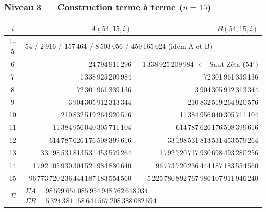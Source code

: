 \documentclass[11pt,a4paper]{article}
\begin{document}
\subsubsection{Niveau 3 --- Construction terme à terme (\texorpdfstring{$n = 15$}{n = 15})}
\begin{center}\small
\begin{tabular}{@{}c r r@{}}
\toprule
\rowcolor{spectralgris}
$i$ & $A(54,15,i)$ & $B(54,15,i)$ \\
\midrule
1--5 & \multicolumn{2}{l}{54 / 2\,916 / 157\,464 / 8\,503\,056 / 459\,165\,024 \quad (idem A et B)} \\
6 & 24\,794\,911\,296 & 1\,338\,925\,209\,984 \quad $\leftarrow$ Saut Zêta ($54^{7}$) \\
7 & 1\,338\,925\,209\,984 & 72\,301\,961\,339\,136 \\
8 & 72\,301\,961\,339\,136 & 3\,904\,305\,912\,313\,344 \\
9 & 3\,904\,305\,912\,313\,344 & 210\,832\,519\,264\,920\,576 \\
10 & 210\,832\,519\,264\,920\,576 & 11\,384\,956\,040\,305\,711\,104 \\
11 & 11\,384\,956\,040\,305\,711\,104 & 614\,787\,626\,176\,508\,399\,616 \\
12 & 614\,787\,626\,176\,508\,399\,616 & 33\,198\,531\,813\,531\,453\,579\,264 \\
13 & 33\,198\,531\,813\,531\,453\,579\,264 & 1\,792\,720\,717\,930\,698\,493\,280\,256 \\
14 & 1\,792\,105\,930\,304\,521\,984\,880\,640 & 96\,773\,720\,236\,444\,187\,183\,554\,560 \\
15 & 96\,773\,720\,236\,444\,187\,183\,554\,560 & 5\,225\,780\,892\,767\,986\,107\,911\,946\,240 \\
\midrule
$\Sigma$ & \multicolumn{2}{l}{$\Sigma A = 98\,599\,651\,085\,954\,948\,762\,648\,034$ \quad $\Sigma B = 5\,324\,381\,158\,641\,567\,208\,388\,082\,594$} \\
\bottomrule
\end{tabular}
\end{center}
\end{document}
